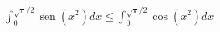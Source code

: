 \item $\displaystyle \int_0^{\sqrt{\pi}/2} \operatorname{sen}(x^2) dx \le \int_0^{\sqrt{\pi}/2} \cos(x^2) dx$
